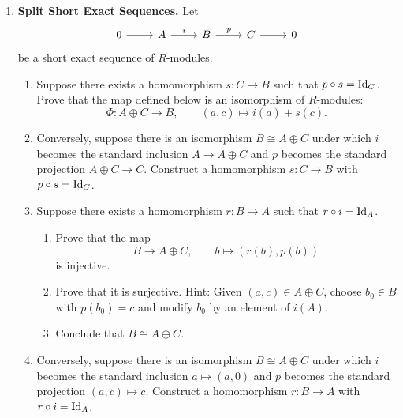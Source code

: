 \documentclass[12pt,reqno]{amsart}
\begin{document}
\begin{enumerate}[leftmargin=*, resume=problems]
\item \textbf{Split Short Exact Sequences.} Let
\[
\begin{tikzcd}
0 \ar[r] & A \ar[r, "i"] & B \ar[r, "p"] & C \ar[r] & 0
\end{tikzcd}
\]
be a short exact sequence of $R$-modules.
\begin{enumerate}
\item Suppose there exists a homomorphism $s:C\to B$ such that $p\circ s=\operatorname{Id}_C$. Prove that the map defined below is an isomorphism of $R$-modules:
\[
\Phi:A\oplus C\longrightarrow B,
\qquad
(a,c)\longmapsto i(a)+s(c).
\]
\item Conversely, suppose there is an isomorphism $B\cong A\oplus C$ under which $i$ becomes the standard inclusion $A\to A\oplus C$ and $p$ becomes the standard projection $A\oplus C\to C$. Construct a homomorphism $s:C\to B$ with $p\circ s=\operatorname{Id}_C$.
\item Suppose there exists a homomorphism $r:B\to A$ such that $r\circ i=\operatorname{Id}_A$.
\begin{enumerate}
\item Prove that the map
\[
B\longrightarrow A\oplus C,\qquad b\longmapsto (r(b),p(b))
\]
is injective.
\item Prove that it is surjective. Hint: Given $(a,c)\in A\oplus C$, choose $b_0\in B$ with $p(b_0)=c$ and modify $b_0$ by an element of $i(A)$.
\item Conclude that $B\cong A\oplus C$.
\end{enumerate}
\item Conversely, suppose there is an isomorphism $B\cong A\oplus C$ under which $i$ becomes the standard inclusion $a\mapsto(a,0)$ and $p$ becomes the standard projection $(a,c)\mapsto c$. Construct a homomorphism $r:B\to A$ with $r\circ i=\operatorname{Id}_A$.
\end{enumerate}


\end{enumerate}
\end{document}
